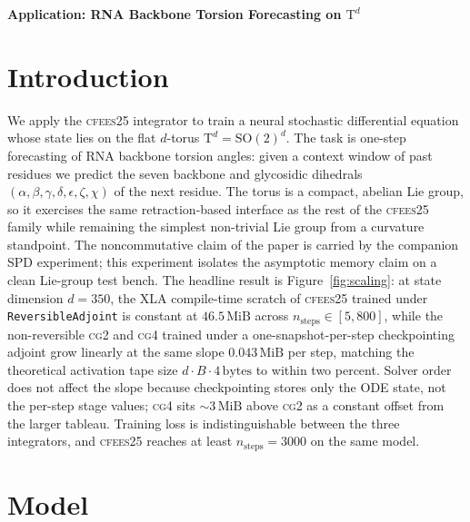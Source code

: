\documentclass[11pt,a4paper]{article}
\newcommand{\cfees}{\textsc{cfees25}}
\newcommand{\cgtwo}{\textsc{cg2}}
\newcommand{\Torus}{\mathrm{T}}
\newcommand{\SO}{\mathrm{SO}}
\begin{document}
{\centering\bfseries\large
Application: RNA Backbone Torsion Forecasting on $\Torus^d$\par}
\medskip

\section{Introduction}

We apply the \cfees{} integrator to train a neural stochastic
differential equation whose state lies on the flat $d$-torus
$\Torus^{d} = \SO(2)^{d}$. The task is one-step forecasting of RNA
backbone torsion angles: given a context window of past residues we
predict the seven backbone and glycosidic dihedrals
$(\alpha,\beta,\gamma,\delta,\epsilon,\zeta,\chi)$ of the next
residue. The torus is a compact, abelian Lie group, so it exercises
the same retraction-based interface as the rest of the \cfees{}
family while remaining the simplest non-trivial Lie group from a
curvature standpoint. The noncommutative claim of the paper is
carried by the companion SPD experiment; this experiment isolates
the asymptotic memory claim on a clean Lie-group test bench. The
headline result is Figure~\ref{fig:scaling}: at state dimension
$d = 350$, the XLA compile-time scratch of \cfees{} trained under
\texttt{ReversibleAdjoint} is constant at $46.5\,\mathrm{MiB}$
across $n_{\mathrm{steps}} \in [5, 800]$, while the non-reversible
\cgtwo{} and \textsc{cg4} trained under a one-snapshot-per-step
checkpointing adjoint grow linearly at the same slope
$0.043\,\mathrm{MiB}$ per step, matching the theoretical activation
tape size $d \cdot B \cdot 4\,\mathrm{bytes}$ to within two percent.
Solver order does not affect the slope because checkpointing stores
only the ODE state, not the per-step stage values; \textsc{cg4} sits
$\sim\!3\,\mathrm{MiB}$ above \cgtwo{} as a constant offset from the
larger tableau. Training loss is indistinguishable between the
three integrators, and \cfees{} reaches at least
$n_{\mathrm{steps}} = 3000$ on the same model.

\section{Model}
\end{document}
